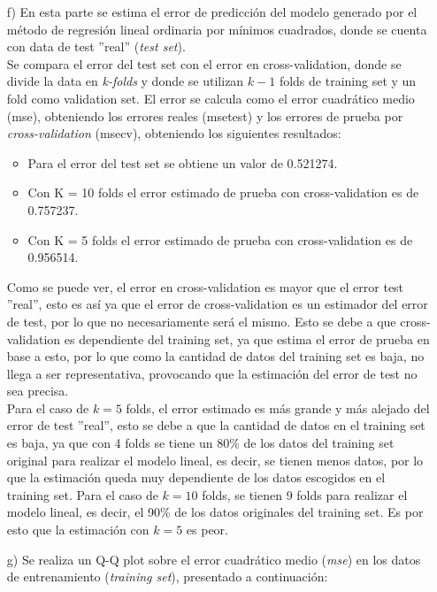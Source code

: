 \documentclass[10pt]{article}
\begin{document}
\begin{itemize}
\item[f)] En esta parte se estima el error de predicción del modelo generado por el método de regresión lineal ordinaria por mínimos cuadrados, donde se cuenta con data de test ''real'' (\textit{test set}).\\
Se compara el error del test set con el error en cross-validation, donde se divide la data en \textit{k-folds} y donde se utilizan $k-1$ folds de training set y un fold como validation set. El error se calcula como el error cuadrático medio (mse), obteniendo los errores reales (msetest) y los errores de prueba por \textit{cross-validation} (msecv), obteniendo los siguientes resultados:
\begin{itemize}
\item Para el error del test set se obtiene un valor de 0.521274.
\item Con K = 10 folds el error estimado de prueba con cross-validation es de 0.757237.
\item Con K = 5 folds el error estimado de prueba con cross-validation es de 0.956514.
\end{itemize}

Como se puede ver, el error en cross-validation es mayor que el error test ''real'', esto es así ya que el error de cross-validation es un estimador del error de test, por lo que no necesariamente será el mismo. Esto se debe a que cross-validation es dependiente del training set, ya que estima el error de prueba en base a esto, por lo que como la cantidad de datos del training set es baja, no llega a ser representativa, provocando que la estimación del error de test no sea precisa. \\

Para el caso de $k=5$ folds, el error estimado es más grande y más alejado del error de test ''real'', esto se debe a que la cantidad de datos en el training set es baja, ya que con 4 folds se tiene un 80\%  de los datos del training set original para realizar el modelo lineal, es decir, se tienen menos datos, por lo que la estimación queda muy dependiente de los datos escogidos en el training set. Para el caso de $k=10$ folds, se tienen 9 folds para realizar el modelo lineal, es decir, el 90\% de los datos originales del training set. Es por esto que la estimación con $k=5$ es peor.

\item[g)] Se realiza un Q-Q plot sobre el error cuadrático medio (\textit{mse}) en los datos de entrenamiento (\textit{training set}), presentado a continuación:\\


\end{itemize}
\end{document}
